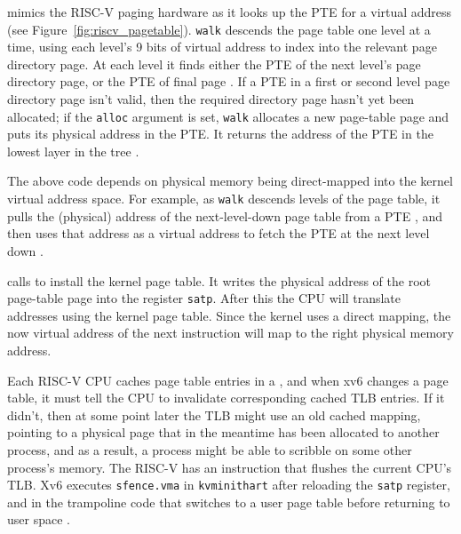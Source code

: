 mimics the RISC-V paging hardware as it
looks up the PTE for a virtual address (see
Figure~\ref{fig:riscv_pagetable}).
\lstinline{walk}
descends the page table one level at a time,
using each level's 9 bits of virtual address to
index into the relevant page directory page.
At each level it finds either the PTE of the
next level's page directory page, or the PTE of
final page
.
If a PTE in a first or second level page directory
page isn't valid, then the required directory page
hasn't yet been allocated;
if the
\lstinline{alloc}
argument is set,
\lstinline{walk}
allocates a new page-table page and puts its physical address in the PTE.
It returns the address of the PTE in the lowest layer in the tree
.

The above code depends on physical memory being direct-mapped into the
kernel virtual address space. For example, as \lstinline{walk} descends levels
of the page table, it pulls the (physical) address of the
next-level-down page table from a PTE ,
and then uses that address as a
virtual address to fetch the PTE at the next level down
.

calls
to install the kernel page table.
It writes the physical address of the root page-table page
into the register
\texttt{satp}.
After this the CPU will translate addresses using the kernel
page table.  Since the kernel uses a direct mapping, the now
virtual address of the next instruction will map to the right physical
memory address.

Each RISC-V CPU caches page table entries in a
, and when xv6 changes
a page table, it must tell the CPU to invalidate corresponding
cached TLB entries.  If it didn't,
then at some point later the TLB might
use an old cached mapping, pointing to a physical page that in the meantime
has been allocated to another process, and as a result, a process
might be able to scribble on some other process's memory.  The RISC-V
has an instruction  that flushes
the current CPU's TLB.
Xv6 executes {\tt sfence.vma} in {\tt kvminithart}  after reloading the 
\texttt{satp} register, and in the trampoline code that
switches to a user page table before returning to user space
.


